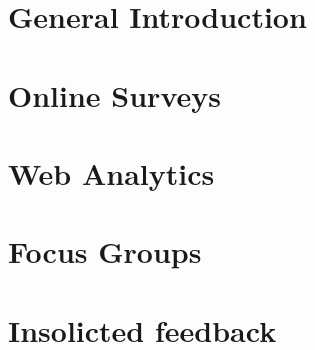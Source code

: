 \documentclass[10pt,letterpaper,twoside,notitlepage]{article}
\author{Alex Mandel}
\title{}
\begin{document}
\section{General Introduction}
\section{Online Surveys}
\section{Web Analytics}
\section{Focus Groups}
\section{Insolicted feedback}


\end{document}
